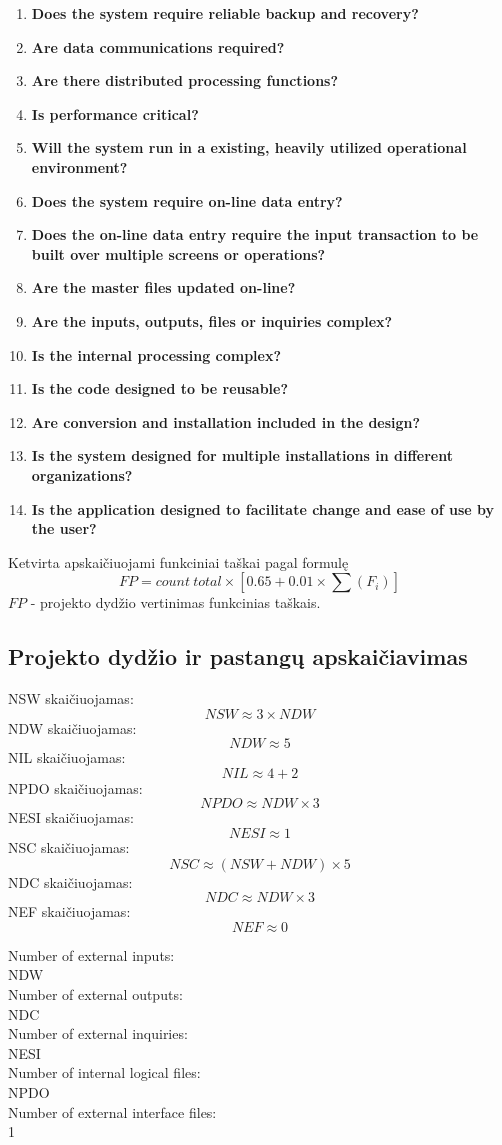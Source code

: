 \documentclass[a4paper,12pt]{article}
\begin{document}
\begin{enumerate}
\item \textbf{Does the system require reliable backup and recovery?}
\item \textbf{Are data communications required?}
\item \textbf{ Are there distributed processing functions?}
\item \textbf{Is performance critical?}
\item \textbf{Will the system run in a existing, heavily utilized operational environment?}
\item \textbf{Does the system require on-line data entry?}
\item \textbf{Does the on-line data entry require the input transaction to be built over multiple screens or operations?}
\item \textbf{Are the master files updated on-line?}
\item \textbf{Are the inputs, outputs, files or inquiries complex?}
\item \textbf{Is the internal processing complex?}
\item \textbf{Is the code designed to be reusable?}
\item \textbf{Are conversion and installation included in the design?}
\item \textbf{Is the system designed for multiple installations in different organizations?}
\item \textbf{Is the application designed to facilitate change and ease of use by the user?}
\end{enumerate}
Ketvirta apskaičiuojami funkciniai taškai pagal formulę
$$ FP = count\ total \times [0.65 + 0.01 \times \sum(F_i)] $$
$FP$ - projekto dydžio vertinimas funkcinias taškais.


\subsection{Projekto dydžio ir pastangų apskaičiavimas}

NSW skaičiuojamas:
	$$NSW \approx 3 \times NDW$$
NDW skaičiuojamas:
	$$NDW \approx 5 $$
NIL skaičiuojamas:
	$$NIL \approx 4 + 2 $$
NPDO skaičiuojamas:
	$$NPDO \approx NDW\times 3$$
NESI skaičiuojamas:
	$$NESI \approx 1 $$
NSC skaičiuojamas:
	$$NSC \approx (NSW+NDW)\times 5$$
NDC skaičiuojamas:
	$$NDC \approx NDW\times 3$$
NEF skaičiuojamas:
	$$NEF \approx 0$$

Number of external inputs:\\
NDW\\
Number of external outputs:\\
NDC\\
Number of external inquiries:\\
NESI\\
Number of internal logical files:\\
NPDO\\
Number of external interface files:\\
1
\end{document}
